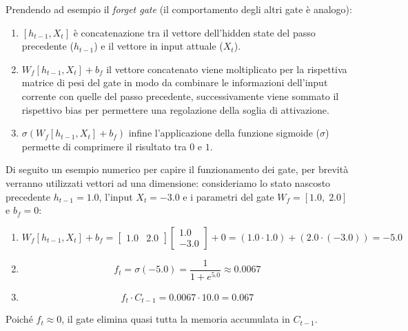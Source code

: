 \documentclass{article}
\begin{document}
Prendendo ad esempio il \textsl{forget gate} (il comportamento degli altri gate è analogo):
\begin{enumerate}
    \item $[h_{t-1}, X_t]$ è concatenazione tra il vettore dell'hidden state del passo precedente ($h_{t-1}$) e il vettore in input attuale ($X_t$).
    \item $W_f[h_{t-1}, X_t] + b_f$ il vettore concatenato viene moltiplicato per la rispettiva matrice di pesi del gate in modo da combinare le informazioni dell'input corrente con quelle del passo precedente, successivamente viene sommato il rispettivo bias per permettere una regolazione della soglia di attivazione.
    \item $\sigma(W_f[h_{t-1}, X_t] + b_f)$ infine l'applicazione della funzione sigmoide ($\sigma$) permette di comprimere il risultato tra $0$ e $1$.
\end{enumerate}
Di seguito un esempio numerico per capire il funzionamento dei gate, per brevità verranno utilizzati vettori ad una dimensione: \newline
consideriamo lo stato nascosto precedente $h_{t-1} = 1.0$, l'input $X_t = -3.0$ e i parametri del gate $W_f = [1.0, \; 2.0]$ e $b_f = 0$:
\begin{enumerate}
    \item 
    \begin{equation*}
        W_f [h_{t-1}, X_t] + b_f = \begin{bmatrix} 1.0 & 2.0 \end{bmatrix} \begin{bmatrix} 1.0 \\ -3.0 \end{bmatrix} + 0 = (1.0 \cdot 1.0) + (2.0 \cdot (-3.0)) = -5.0
    \end{equation*}
    
    \item 
    \begin{equation*}
        f_t = \sigma(-5.0) = \frac{1}{1 + e^{5.0}} \approx 0.0067
    \end{equation*}
    
    \item 
    \begin{equation*}
        f_t \cdot C_{t-1} = 0.0067 \cdot 10.0 = 0.067
    \end{equation*}
\end{enumerate}
Poiché $f_t \approx 0$, il gate elimina quasi tutta la memoria accumulata in $C_{t-1}$.
\end{document}
